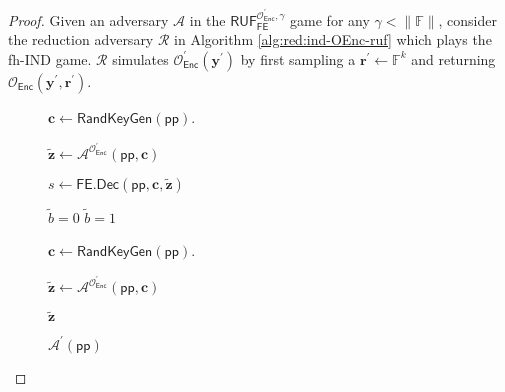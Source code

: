 \begin{proof}

Given an adversary $\mathcal{A}$ in the $\textsf{RUF}^{\mathcal{O}^\prime_{\textsf{Enc}}, \gamma}_{\textsf{FE}}$ game for any $\gamma < \|\mathbb{F}\|$, consider the reduction adversary $\mathcal{R}$ in Algorithm \ref{alg:red:ind-OEnc-ruf} which plays the \textsf{fh-IND} game. $\mathcal{R}$ simulates $\mathcal{O}_\textsf{Enc}^\prime(\mathbf{y}^\prime)$ by first sampling a $\mathbf{r}^\prime \gets \mathbb{F}^k$ and returning $\mathcal{O}_\textsf{Enc}(\mathbf{y}^\prime, \mathbf{r}^\prime)$.

\begin{figure}[h]
\centering

	\begin{minipage}{0.4\linewidth}
	\centering
	\begin{algorithm}[H]
	\caption{$\mathcal{R}^{\mathcal{O}_{\textsf{KeyGen}}, \mathcal{O}_{\textsf{Enc}}}(\textsf{pp})$}
	\label{alg:red:ind-OEnc-ruf}
	\begin{algorithmic}[1]
		\State $\mathbf{c} \gets \textsf{RandKeyGen}(\textsf{pp})$. 

		\State ${\mathbf{\tilde{z}}} \gets {\mathcal{A}}^{\mathcal{O}^\prime_{\textsf{Enc}}} (\textsf{pp}, \mathbf{c})$

		\State $s \gets \textsf{FE.Dec}( \textsf{pp}, \mathbf{c}, \mathbf{\tilde{z}} )$
		
			\State \Return $\tilde{b} = 0$
		\Else
			\State \Return $\tilde{b} = 1$
		\EndIf

	\end{algorithmic}
	\end{algorithm}
	\end{minipage}
	\hspace{0.05\textwidth}
	\begin{minipage}{0.4\linewidth}
	\centering
	\begin{algorithm}[H]
	\caption{$\mathcal{A}^\prime (\textsf{pp})$}
	\label{alg:adv:ind-OEnc-ruf}
	\begin{algorithmic}[1]
		\State $\mathbf{c} \gets \textsf{RandKeyGen}(\textsf{pp})$. 

		\State ${\mathbf{\tilde{z}}} \gets {\mathcal{A}}^{\mathcal{O}^\prime_{\textsf{Enc}}} (\textsf{pp}, \mathbf{c})$

		\State \Return $\mathbf{\tilde{z}}$
	\end{algorithmic}
	\end{algorithm}
	\end{minipage}
	

\end{figure}
\end{proof}
